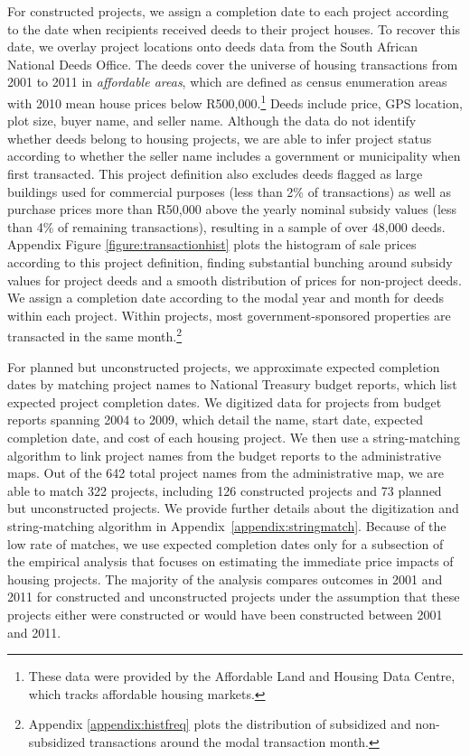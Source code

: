 \documentclass[12pt]{article}
\begin{document}
For constructed projects, we assign a completion date to each project according to the date when recipients received deeds to their project houses.  To recover this date, we overlay project locations onto deeds data from the South African National Deeds Office.  The deeds cover the universe of housing transactions from 2001 to 2011 in {\it affordable areas}, which are defined as census enumeration areas with 2010 mean house prices below R500,000.\footnote{These data were provided by the Affordable Land and Housing Data Centre, which tracks affordable housing markets.} Deeds include price, GPS location, plot size, buyer name, and seller name.  Although the data do not identify whether deeds belong to housing projects, we are able to infer project status according to whether the seller name includes a government or municipality when first transacted.  This project definition also excludes deeds flagged as large buildings used for commercial purposes (less than 2\% of transactions) as well as purchase prices more than R50,000 above the yearly nominal subsidy values (less than 4\% of remaining transactions), resulting in a sample of over 48,000 deeds.  Appendix Figure \ref{figure:transactionhist} plots the histogram of sale prices according to this project definition, finding substantial bunching around subsidy values for project deeds and a smooth distribution of prices for non-project deeds.  We assign a completion date according to the modal year and month for deeds within each project.  Within projects, most government-sponsored properties are transacted in the same month.\footnote{Appendix \ref{appendix:histfreq} plots the distribution of subsidized and non-subsidized transactions around the modal transaction month.} 

For planned but unconstructed projects, we approximate expected completion dates by matching project names to National Treasury budget reports, which list expected project completion dates.  We digitized data for projects from budget reports spanning 2004 to 2009, which detail the name, start date, expected completion date, and cost of each housing project.  We then use a string-matching algorithm to link project names from the budget reports to the administrative maps.  Out of the 642 total project names from the administrative map, we are able to match 322 projects, including 126 constructed projects and 73 planned but unconstructed projects.  We provide further details about the digitization and string-matching algorithm in Appendix~\ref{appendix:stringmatch}.  Because of the low rate of matches, we use expected completion dates only for a subsection of the empirical analysis that focuses on estimating the immediate price impacts of housing projects.  The majority of the analysis compares outcomes in 2001 and 2011 for constructed and unconstructed projects under the assumption that these projects either were constructed or would have been constructed between 2001 and 2011.
\end{document}
